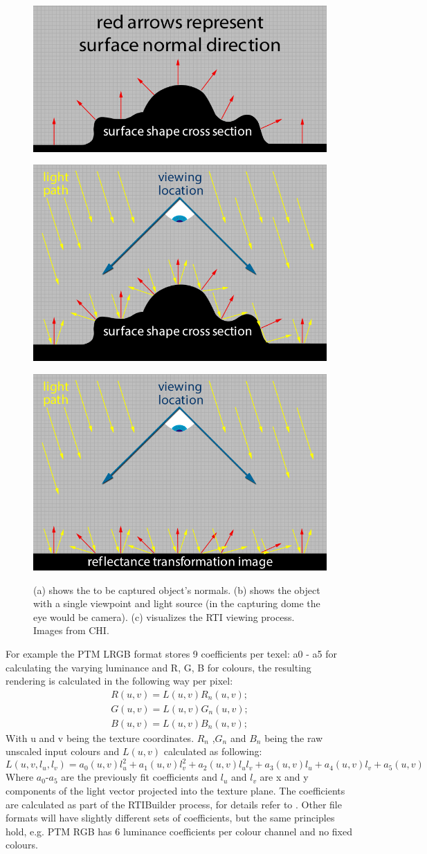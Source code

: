 \begin{figure}
\begin{subfloat}[]{\includegraphics[max width=0.32\linewidth]{images/normals_01}}\end{subfloat}
\begin{subfloat}[]{\includegraphics[max width=0.32\linewidth]{images/normals_02}}\end{subfloat}
\begin{subfloat}[]{\includegraphics[max width=0.32\linewidth]{images/normals_03}}\end{subfloat}
\caption[RTI Overview]{(a) shows the to be captured object's normals.
  (b) shows the object with a single viewpoint and light source (in the
  capturing dome the eye would be camera). (c) visualizes the RTI viewing
  process. Images from CHI\cite*{noauthor_cultural_nodate}.}
\label{overview1}
\end{figure}

For example the PTM LRGB format\cite*{malzbender_polynomial_2001} stores 9
coefficients per texel: a0 - a5 for calculating the varying luminance and R, G, B
for colours, the resulting rendering is calculated in the following way per pixel:
\begin{align*}
R(u,v) = L(u,v)R_{n}(u,v);\\
G(u,v) = L(u,v)G_{n}(u,v);\\
B(u,v) = L(u,v)B_{n}(u,v);
\end{align*}
With u and v being the texture coordinates. $R_{n}$ ,$G_{n}$ and $B_{n}$ being
the raw unscaled input colours and $L(u, v)$ calculated as following:
\begin{equation*}
  L(u,v,l_{u},l_{v})=a_{0}(u,v)l_{u}^{2}+a_{1}(u,v)l_{v}^{2}+a_{2}(u,v)l_{u}l_{v}+a_{3}(u,v)l_{u}+a_{4}(u,v)l_{v}+a_{5}(u,v)
\end{equation*}
Where $a_{0}$-$a_{5}$ are the previously fit coefficients and $l_{u}$ and
$l_{v}$ are x and y components of the light vector projected into the texture
plane. The coefficients are calculated as part of the RTIBuilder process, for details refer to \cite*{malzbender_polynomial_2001}.
Other file formats will have slightly different sets of coefficients, but the
same principles hold, e.g. PTM RGB has 6 luminance coefficients per colour
channel and no fixed colours.

